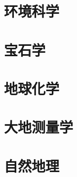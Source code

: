 \documentclass[UTF8]{NatureUniverse}
\begin{document}
\section{环境科学}
\section{宝石学}
\section{地球化学}
\section{大地测量学}
\section{自然地理}
\end{document}

